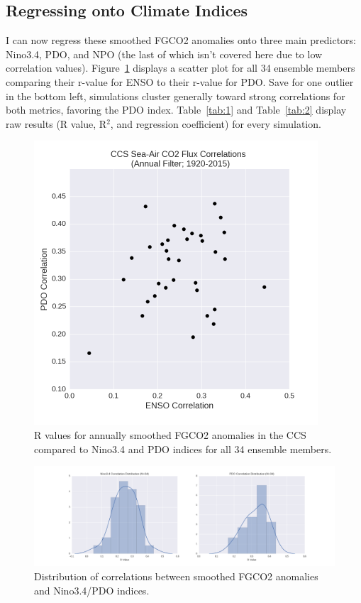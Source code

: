 \documentclass[12pt]{article}
\begin{document}
\subsection{Regressing onto Climate Indices}
I can now regress these smoothed FGCO2 anomalies onto three main predictors: Nino3.4, PDO, and NPO (the last of which isn't covered here due to low correlation values). Figure~\ref{fig:7} displays a scatter plot for all 34 ensemble members comparing their r-value for ENSO to their r-value for PDO. Save for one outlier in the bottom left, simulations cluster generally toward strong correlations for both metrics, favoring the PDO index. Table~\ref{tab:1} and Table~\ref{tab:2} display raw results (R value, R$^{2}$, and regression coefficient) for every simulation.
\newpage
\begin{figure}[!h]
	\centering
	\includegraphics[width=25pc]{../../figs/CCS/correlations_scatter/CCS-ENSO-PDO-Correlation-Scatter.png}
	\caption{R values for annually smoothed FGCO2 anomalies in the CCS compared to Nino3.4 and PDO indices for all 34 ensemble members.}
	\label{fig:7}
\end{figure}
\begin{figure}[!h]
	\centering
	\includegraphics[width=39pc]{../../figs/CCS/correlations_scatter/ensemble-correlation-distribution-enso+pdo.png}
	\caption{Distribution of correlations between smoothed FGCO2 anomalies and Nino3.4/PDO indices.}
	\label{fig:8}
\end{figure}
\end{document}
